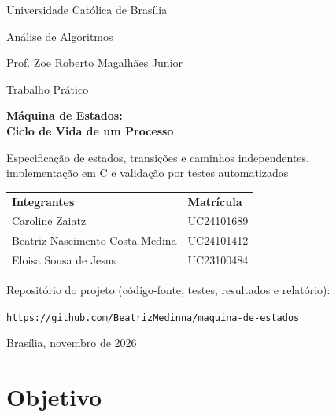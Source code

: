 \documentclass[11pt,a4paper]{article}
\theoremstyle{definition}
\begin{document}
\begin{titlepage}
\centering
{\large Universidade Católica de Brasília\par}
\vspace{2mm}
{\large Análise de Algoritmos\par}
\vspace{2mm}
{\normalsize Prof. Zoe Roberto Magalhães Junior\par}

\vspace{3.2cm}
{\normalsize Trabalho Prático\par}
\vspace{3mm}
{\LARGE\bfseries Máquina de Estados:\\[2mm] Ciclo de Vida de um Processo\par}
\vspace{6mm}
{\normalsize Especificação de estados, transições e caminhos independentes,\\
implementação em C e validação por testes automatizados\par}

\vspace{3.2cm}
\begin{tabular}{ll}
\textbf{Integrantes} & \textbf{Matrícula} \\[1mm]
Caroline Zaiatz & UC24101689 \\
Beatriz Nascimento Costa Medina & UC24101412 \\
Eloisa Sousa de Jesus & UC23100484 \\
\end{tabular}

\vfill
{\small Repositório do projeto (código-fonte, testes, resultados e relatório):\par}
{\small\texttt{https://github.com/BeatrizMedinna/maquina-de-estados}\par}

\vspace{1.6cm}
{\normalsize Brasília, novembro de 2026\par}
\end{titlepage}

\tableofcontents
\clearpage

\section{Objetivo}
\end{document}

